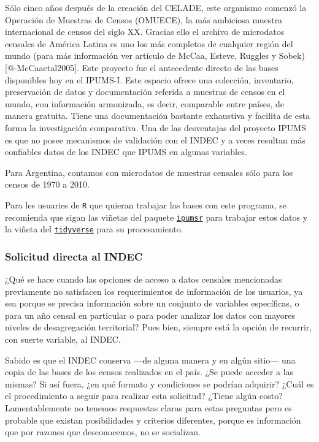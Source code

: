 \documentclass[
]{article}
\begin{document}
Sólo cinco años después de la creación del CELADE, este organismo comenzó la Operación de Muestras de Censos (OMUECE), la más ambiciosa muestra internacional de censos del siglo XX. Gracias ello el archivo de microdatos censales de América Latina es uno los más completos de cualquier región del mundo (para más información ver artículo de McCaa, Esteve, Ruggles y Sobek) {[}@-McCaaetal2005{]}. Este proyecto fue el antecedente directo de las bases disponibles hoy en el IPUMS-I. Este espacio ofrece una colección, inventario, preservación de datos y documentación referida a muestras de censos en el mundo, con información armonizada, es decir, comparable entre países, de manera gratuita. Tiene una documentación bastante exhaustiva y facilita de esta forma la investigación comparativa. Una de las desventajas del proyecto IPUMS es que no posee mecanismos de validación con el INDEC y a veces resultan más confiables datos de los INDEC que IPUMS en algunas variables.

Para Argentina, contamos con microdatos de muestras censales sólo para los censos de 1970 a 2010.

Para les usuaries de \texttt{R} que quieran trabajar las bases con este programa, se recomienda que sigan las viñetas del paquete \href{https://cran.r-project.org/web/packages/ipumsr/vignettes/ipums.html}{\texttt{ipumsr}} para trabajar estos datos y la viñeta del \href{https://www.tidyverse.org/}{\texttt{tidyverse}} para su procesamiento.

\hypertarget{solicitud-directa-al-indec}{%
\subsubsection{Solicitud directa al INDEC}\label{solicitud-directa-al-indec}}

¿Qué se hace cuando las opciones de acceso a datos censales mencionadas previamente no satisfacen los requerimientos de información de los usuarios, ya sea porque se precisa información sobre un conjunto de variables específicas, o para un año censal en particular o para poder analizar los datos con mayores niveles de desagregación territorial? Pues bien, siempre está la opción de recurrir, con suerte variable, al INDEC.

Sabido es que el INDEC conserva ---de alguna manera y en algún sitio--- una copia de las bases de los censos realizados en el país. ¿Se puede acceder a las mismas? Si así fuera, ¿en qué formato y condiciones se podrían adquirir? ¿Cuál es el procedimiento a seguir para realizar esta solicitud? ¿Tiene algún costo? Lamentablemente no tenemos respuestas claras para estas preguntas pero es probable que existan posibilidades y criterios diferentes, porque es información que por razones que desconocemos, no se socializan.
\end{document}
